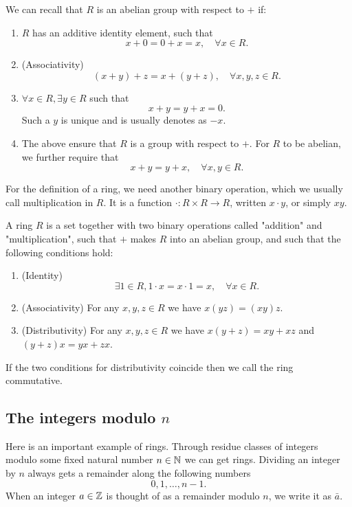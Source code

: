 \documentclass[10pt, a4paper]{article}
\begin{document}
We can recall that $R$ is an abelian group with respect to $+$ if:
\begin{enumerate}[label = (\roman*)]
    \item $R$ has an additive identity element,
    such that
    \[
    x + 0 = 0 + x = x,\quad\forall x \in R.
    \]

    \item (Associativity)
    \[
    (x + y) + z = x + (y + z),\quad \forall x, y, z \in R.
    \]

    \item $\forall x \in R, \exists y \in R$ such that
    \[
    x + y = y + x = 0.
    \]
    Such a $y$ is unique and is usually denotes as $-x$.

    \item The above ensure that $R$ is a group with respect to $+$.
    For $R$ to be abelian,
    we further require that
    \[
    x + y = y + x,\quad\forall x, y \in R.
    \]
\end{enumerate}

For the definition of a ring,
we need another binary operation,
which we usually call multiplication in $R$.
It is a function $\cdot : R \times R \to R$,
written $x \cdot y$,
or simply $xy$.

\begin{definition}[Ring]
    A ring $R$ is a set together with two binary operations called "addition" and "multiplication",
    such that $+$ makes $R$ into an abelian group,
    and such that the following conditions hold:
    \begin{enumerate}[label = \roman*)]
        \item (Identity)
        \[
        \exists 1 \in R, 1 \cdot x = x \cdot 1 = x,\quad\forall x \in R.
        \]

        \item (Associativity)
        For any $x, y, z \in R$ we have $x(yz) = (xy)z$.

        \item (Distributivity)
        For any $x, y, z \in R$ we have $x(y + z) = xy + xz$ and $(y + z)x = yx + zx$.
    \end{enumerate}
\end{definition}

If the two conditions for distributivity coincide then we call the ring commutative.

\subsection{The integers modulo \texorpdfstring{$n$}{}}
Here is an important example of rings.
Through residue classes of integers modulo some fixed natural number $n \in \mathbb{N}$ we can get rings.
Dividing an integer by $n$ always gets a remainder along the following numbers
\[
0, 1, \dotsc, n - 1.
\]
When an integer $a \in \mathbb{Z}$ is thought of as a remainder modulo $n$,
we write it as $\bar{a}$.
\end{document}
